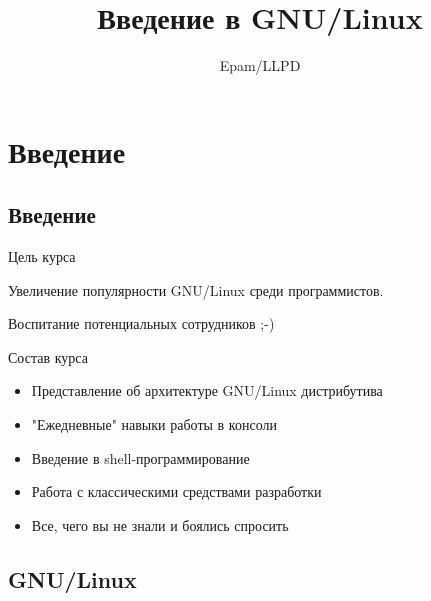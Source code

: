 \documentclass[ignorenonframetext, professionalfonts, hyperref={pdftex, unicode}]{beamer}
\title{Введение в GNU/Linux}
\author{Epam/LLPD}
\begin{document}
\section{Введение}


\frame{
	\frametitle{}
	\titlepage
	\vspace{-0.5cm}
	\begin{center}
	\end{center}
}
\frame{
	\tableofcontents
}















\subsection{Введение}

\begin{frame}{Цель курса}
	\begin{center}
		\Huge
		Увеличение популярности GNU/Linux среди программистов.

		\hrulefill

		\normalsize
		Воспитание потенциальных сотрудников ;-)
	\end{center}
\end{frame}


\begin{frame}{Состав курса}
	\begin{itemize}
		\item Представление об архитектуре GNU/Linux дистрибутива
			\pause
		\item "Ежедневные" навыки работы в консоли
			\pause
		\item Введение в shell-программирование
			\pause
		\item Работа с классическими средствами разработки
			\pause
		\item Все, чего вы не знали и боялись спросить
	\end{itemize}
\end{frame}




\subsection{GNU/Linux}
\end{document}

